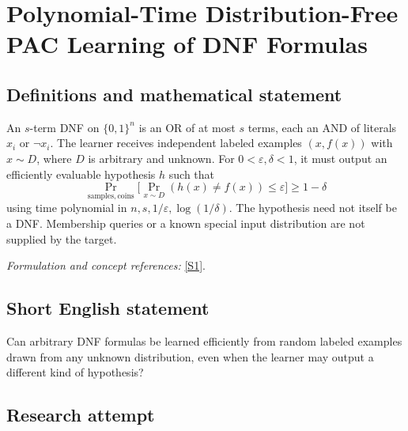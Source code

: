 \documentclass[11pt,a4paper]{article}
\newcommand{\eps}{\varepsilon}
\newcommand{\sref}[2]{\hyperlink{source:#1:#2}{[S#2]}}
\newif\ifshowcatalogue
\newcommand{\cataloguescope}[1]{\ifshowcatalogue
 \paragraph{Exact scope in the supplied catalogue.}
 \begin{quote}\small #1\end{quote}\fi}
\numberwithin{equation}{section}
\begin{document}
\setcounter{section}{218}
\clearpage
\section{\texorpdfstring{Polynomial-Time Distribution-Free PAC Learning of DNF Formulas}{Polynomial-Time Distribution-Free PAC Learning of DNF Formulas}}\label{219}
\subsection{Definitions and mathematical statement}
An $s$-term DNF on $\{0,1\}^n$ is an OR of at most $s$ terms, each an AND of literals $x_i$ or $\neg x_i$. The learner receives independent labeled examples $(x,f(x))$ with $x\sim D$, where $D$ is arbitrary and unknown. For $0<\eps,\delta<1$, it must output an efficiently evaluable hypothesis $h$ such that
\[
 \Pr_{\mathrm{samples,coins}}\bigl[\Pr_{x\sim D}(h(x)\ne f(x))\le\eps\bigr]\ge1-\delta
\]
using time polynomial in $n,s,1/\eps,\log(1/\delta)$. The hypothesis need not itself be a DNF. Membership queries or a known special input distribution are not supplied by the target.
\par\smallskip\textit{Formulation and concept references:} \sref{219}{1}.
\cataloguescope{Given an unknown s-term DNF f on \{0,1\}\textasciicircum{}n and random labeled examples drawn from an arbitrary unknown distribution D, construct a possibly improper hypothesis in time polynomial in n, s, 1/epsilon, and log(1/delta) whose D-error is at most epsilon with probability at least 1-delta.}
\subsection{Short English statement}
Can arbitrary DNF formulas be learned efficiently from random labeled examples drawn from any unknown distribution, even when the learner may output a different kind of hypothesis?
\subsection{Research attempt}
\end{document}
